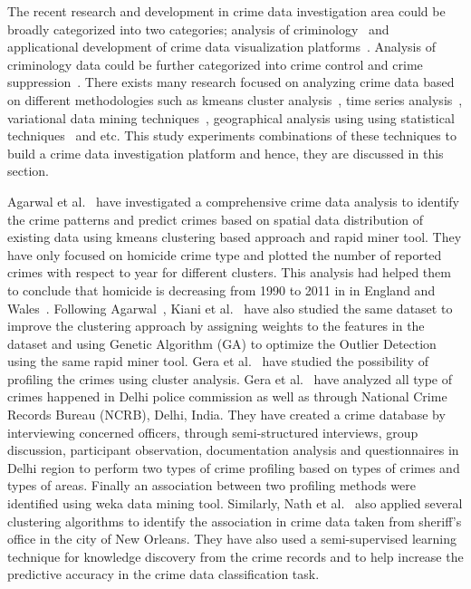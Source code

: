 The recent research and development in crime data investigation area
could be broadly categorized into two categories; analysis of
criminology~\cite{hid-sp18-409-agarwal2013crime,
hid-sp18-409-bharathi2014survey, hid-sp18-409-kiani2015analysis,
hid-sp18-409-nath2006crime, hid-sp18-409-gera2014city} and
applicational development of crime data visualization
platforms~\cite{hid-sp18-409-www-spotcrime,
hid-sp18-409-www-crimereports, hid-sp18-409-www-mylocalcrime,
hid-sp18-409-www-crimemapping}. Analysis of criminology data could be
further categorized into crime control and crime
suppression~\cite{hid-sp18-409-agarwal2013crime}. There exists many
research focused on analyzing crime data based on different
methodologies such as kmeans cluster
analysis~\cite{hid-sp18-409-gera2014city, hid-sp18-409-nath2006crime,
hid-sp18-409-agarwal2013crime}, time series
analysis~\cite{hid-sp18-409-wei2006time}, variational data mining
techniques~\cite{hid-sp18-409-chen2004crime}, geographical analysis
using using statistical techniques~\cite{hid-sp18-409-santos2016crime}
and etc. This study experiments combinations of these techniques to
build a crime data investigation platform and hence, they are
discussed in this section.

Agarwal et al.~\cite{hid-sp18-409-agarwal2013crime} have investigated
a comprehensive crime data analysis to identify the crime patterns and
predict crimes based on spatial data distribution of existing data
using kmeans clustering based approach and rapid miner tool. They have
only focused on homicide crime type and plotted the number of reported
crimes with respect to year for different clusters. This analysis had
helped them to conclude that homicide is decreasing from 1990 to 2011
in in England and Wales~\cite{hid-sp18-409-agarwal2013crime}.
Following Agarwal~\cite{hid-sp18-409-agarwal2013crime}, Kiani et
al.~\cite{hid-sp18-409-kiani2015analysis} have also studied the same
dataset to improve the clustering approach by assigning weights to the
features in the dataset and using Genetic Algorithm (GA) to optimize
the Outlier Detection using the same rapid miner tool. Gera et
al.~\cite{hid-sp18-409-gera2014city} have studied the possibility of
profiling the crimes using cluster analysis. Gera et
al.~\cite{hid-sp18-409-gera2014city} have analyzed all type of crimes
happened in Delhi police commission as well as through National Crime
Records Bureau (NCRB), Delhi, India. They have created a crime
database by interviewing concerned officers, through semi-structured
interviews, group discussion, participant observation, documentation
analysis and questionnaires in Delhi region to perform two types of
crime profiling based on types of crimes and types of areas. Finally
an association between two profiling methods were identified using
weka data mining tool. Similarly, Nath et
al.~\cite{hid-sp18-409-nath2006crime} also applied several clustering
algorithms to identify the association in crime data taken from
sheriff’s office in the city of New Orleans. They have also used a
semi-supervised learning technique for knowledge discovery from the
crime records and to help increase the predictive accuracy in the
crime data classification task.

